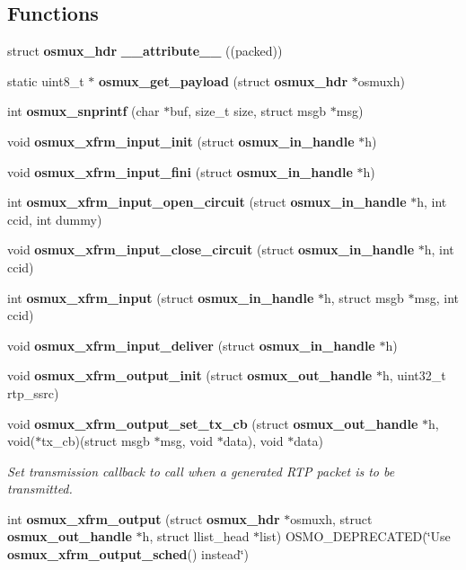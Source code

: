 \subsection*{Functions}
\begin{DoxyCompactItemize}
\item 
struct {\bf osmux\+\_\+hdr} {\bfseries \+\_\+\+\_\+attribute\+\_\+\+\_\+} ((packed))
\item 
static uint8\+\_\+t $\ast$ {\bfseries osmux\+\_\+get\+\_\+payload} (struct {\bf osmux\+\_\+hdr} $\ast$osmuxh)
\item 
int {\bf osmux\+\_\+snprintf} (char $\ast$buf, size\+\_\+t size, struct msgb $\ast$msg)
\item 
void {\bfseries osmux\+\_\+xfrm\+\_\+input\+\_\+init} (struct {\bf osmux\+\_\+in\+\_\+handle} $\ast$h)
\item 
void {\bfseries osmux\+\_\+xfrm\+\_\+input\+\_\+fini} (struct {\bf osmux\+\_\+in\+\_\+handle} $\ast$h)
\item 
int {\bfseries osmux\+\_\+xfrm\+\_\+input\+\_\+open\+\_\+circuit} (struct {\bf osmux\+\_\+in\+\_\+handle} $\ast$h, int ccid, int dummy)
\item 
void {\bfseries osmux\+\_\+xfrm\+\_\+input\+\_\+close\+\_\+circuit} (struct {\bf osmux\+\_\+in\+\_\+handle} $\ast$h, int ccid)
\item 
int {\bf osmux\+\_\+xfrm\+\_\+input} (struct {\bf osmux\+\_\+in\+\_\+handle} $\ast$h, struct msgb $\ast$msg, int ccid)
\item 
void {\bfseries osmux\+\_\+xfrm\+\_\+input\+\_\+deliver} (struct {\bf osmux\+\_\+in\+\_\+handle} $\ast$h)
\item 
void {\bfseries osmux\+\_\+xfrm\+\_\+output\+\_\+init} (struct {\bf osmux\+\_\+out\+\_\+handle} $\ast$h, uint32\+\_\+t rtp\+\_\+ssrc)
\item 
void {\bf osmux\+\_\+xfrm\+\_\+output\+\_\+set\+\_\+tx\+\_\+cb} (struct {\bf osmux\+\_\+out\+\_\+handle} $\ast$h, void($\ast$tx\+\_\+cb)(struct msgb $\ast$msg, void $\ast$data), void $\ast$data)
\begin{DoxyCompactList}\small\item\em Set transmission callback to call when a generated R\+TP packet is to be transmitted. \end{DoxyCompactList}\item 
int {\bfseries osmux\+\_\+xfrm\+\_\+output} (struct {\bf osmux\+\_\+hdr} $\ast$osmuxh, struct {\bf osmux\+\_\+out\+\_\+handle} $\ast$h, struct llist\+\_\+head $\ast$list) O\+S\+M\+O\+\_\+\+D\+E\+P\+R\+E\+C\+A\+T\+ED(\char`\"{}Use {\bf osmux\+\_\+xfrm\+\_\+output\+\_\+sched}() instead\char`\"{})

\end{DoxyCompactItemize}
